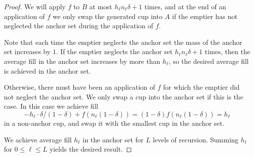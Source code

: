 \documentclass[twocolumn]{article}[10pt]
\begin{document}
\begin{proof}
  We will apply $f$ to $B$ at most $h_\ell n_\ell\delta + 1$ times, and at the
  end of an application of $f$ we only swap the generated cup into $A$ if the
  emptier has not neglected the anchor set during the application of $f$.

  Note that each time the emptier neglects the anchor set the mass of the
  anchor set increases by $1$. If the emptier neglects the anchor set $h_\ell
  n_\ell\delta + 1$ times, then the average fill in the anchor set increases by
  more than $h_\ell$, so the desired average fill is achieved in the anchor set.

  Otherwise, there must have been an application of $f$ for which the emptier
  did not neglect the anchor set. We only swap a cup into the anchor set if
  this is the case. In this case we achieve fill 
  $$-h_\ell \cdot \delta/(1-\delta) + f(n_\ell (1-\delta)) = (1-\delta)f(n_\ell
  (1-\delta)) = h_\ell$$
  in a non-anchor cup, and swap it with the smallest cup in the anchor set.

  We achieve average fill $h_\ell$ in the anchor set for $L$ levels of
  recursion. Summing $h_\ell$ for $0\le \ell \le L$ yields the desired result.

\end{proof}
\end{document}
